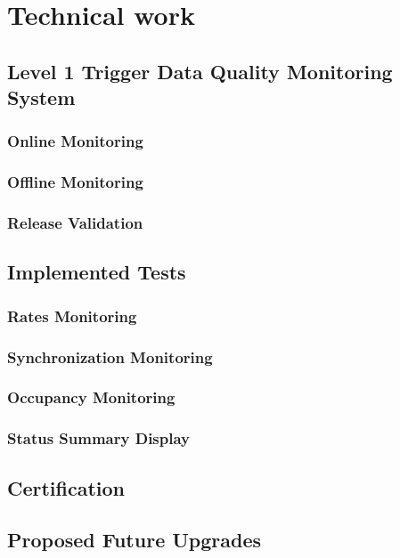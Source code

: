 \chapter{Technical work}

\section{Level 1 Trigger Data Quality Monitoring System}

\subsection{Online Monitoring}

\subsection{Offline Monitoring}

\subsection{Release Validation}

\section{Implemented Tests}

\subsection{Rates Monitoring}

\subsection{Synchronization Monitoring}

\subsection{Occupancy Monitoring}

\subsection{Status Summary Display}

\section{Certification}

\section{Proposed Future Upgrades}
